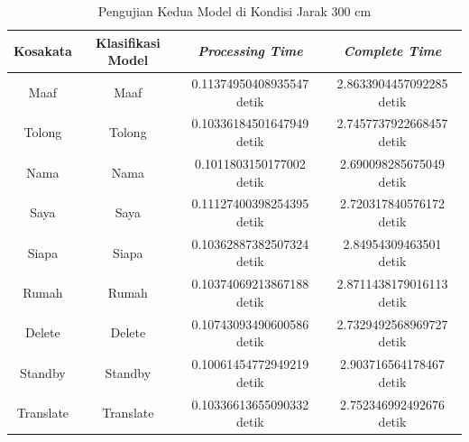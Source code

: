 \begin{longtable}{|c|c|c|c|}
  \caption{Pengujian Kedua Model di Kondisi Jarak 300 cm}
  \label{tb:prediksijauh2}                                   \\
  \hline
  \rowcolor[HTML]{C0C0C0}
  \textbf{Kosakata} & \textbf{Klasifikasi Model} & \textbf{\emph{Processing Time}} & \textbf{\emph{Complete Time}}\\
  \hline
  Maaf              & Maaf                          & 0.11374950408935547 detik                           & 2.8633904457092285 detik                                  \\
  Tolong            & Tolong                        & 0.10336184501647949 detik                           & 2.7457737922668457 detik                                  \\
  Nama              & Nama                          & 0.1011803150177002 detik                            & 2.690098285675049 detik                                 \\
  Saya              & Saya                          & 0.11127400398254395 detik                           & 2.720317840576172 detik                                 \\
  Siapa              & Siapa                        & 0.10362887382507324 detik                           & 2.84954309463501 detik                                \\
  Rumah             & Rumah                         & 0.10374069213867188 detik                           & 2.8711438179016113 detik                                  \\
  Delete            & Delete                        & 0.10743093490600586 detik                           & 2.7329492568969727 detik                                  \\
  Standby           & Standby                       & 0.10061454772949219 detik                           & 2.903716564178467 detik                                 \\
  Translate         & Translate                     & 0.10336613655090332 detik                           & 2.752346992492676 detik                                 \\
  \hline
\end{longtable}

